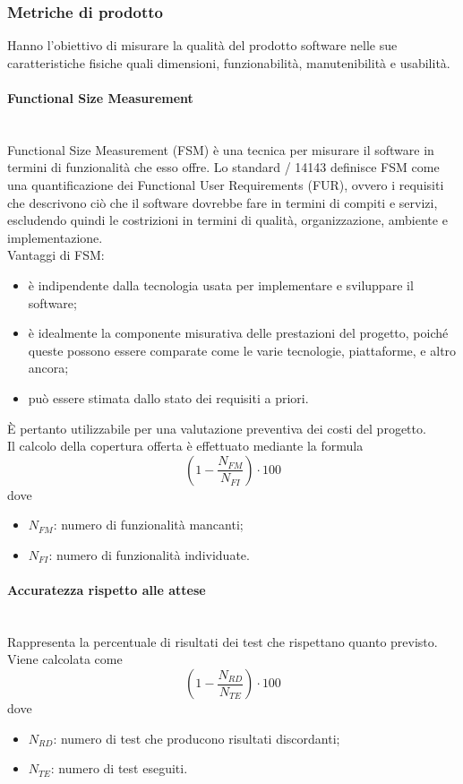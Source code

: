 \subsubsection{Metriche di prodotto}
Hanno l'obiettivo di misurare la qualità del prodotto software nelle sue caratteristiche fisiche quali dimensioni, funzionabilità, manutenibilità e usabilità.

\paragraph{Functional Size Measurement}\mbox{}\\
Functional Size Measurement (FSM) è una tecnica per misurare il software in termini di funzionalità che esso offre. Lo standard / 14143 definisce FSM come una quantificazione dei Functional User Requirements (FUR), ovvero i requisiti che descrivono ciò che il software dovrebbe fare in termini di compiti e servizi, escludendo quindi le costrizioni in termini di qualità, organizzazione, ambiente e implementazione.\\
Vantaggi di FSM:
\begin{itemize}
	\item è indipendente dalla tecnologia usata per implementare e sviluppare il software;
	\item è idealmente la componente misurativa delle prestazioni del progetto, poiché queste possono essere comparate come le varie tecnologie, piattaforme, e altro ancora;
	\item può essere stimata dallo stato dei requisiti a priori.
\end{itemize}
\`{E} pertanto utilizzabile per una valutazione preventiva dei costi del progetto.\\
Il calcolo della copertura offerta è effettuato mediante la formula
\[ \left(1 - \frac{N_{FM}}{N_{FI}} \right) \cdot 100 \]
dove
\begin{itemize}
	\item $N_{FM}$: numero di funzionalità mancanti;
	\item $N_{FI}$: numero di funzionalità individuate. 
\end{itemize}

\paragraph{Accuratezza rispetto alle attese}\mbox{}\\
Rappresenta la percentuale di risultati dei test che rispettano quanto previsto. Viene calcolata come
\[ \left(1 - \frac{N_{RD}}{N_{TE}} \right) \cdot 100 \]
dove
\begin{itemize}
	\item $N_{RD}$: numero di test che producono risultati discordanti;
	\item $N_{TE}$: numero di test eseguiti.
\end{itemize}

